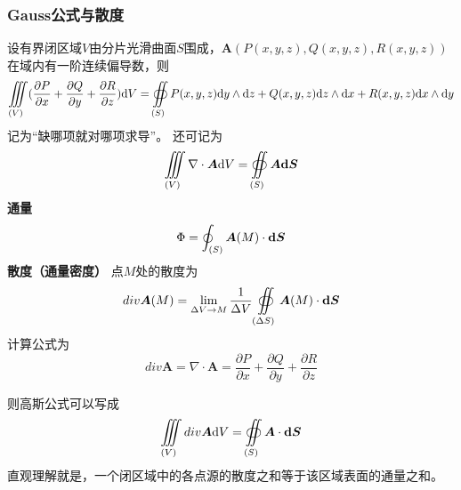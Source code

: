 \subsubsection{Gauss公式与散度}
设有界闭区域$V$由分片光滑曲面$S$围成，$\bm{A}(P(x,y,z),Q(x,y,z),R(x,y,z))$在域内有一阶连续偏导数，则
\begin{equation}\label{key}
	\iiint\limits_{(V)}(\dfrac{\partial P}{\partial x}+\dfrac{\partial Q}{\partial y}+\dfrac{\partial R}{\partial z})\mathrm{d} V=\oiint\limits_{(S)}P(x,y,z)\mathrm{d} y \wedge \mathrm{d} z+Q(x,y,z)\mathrm{d} z \wedge \mathrm{d} x+R(x,y,z)\mathrm{d} x \wedge \mathrm{d} y
\end{equation}
记为“缺哪项就对哪项求导”。
还可记为
\begin{equation}\label{key}
	\iiint\limits_{(V)}\nabla\cdot \bm{A}\mathrm{d} V=\oiint \limits_{(S)}\bm{A}\bm{\mathrm{d} S}
\end{equation}
\textbf{通量}
\begin{equation}\label{key}
	\Phi=\oint_{(S)}\bm{A}(M)\cdot \bm{\mathrm{d} S}
\end{equation}
\textbf{散度（通量密度）} \quad 点$M$处的散度为
\begin{equation}\label{key}
	div \bm{A}(M)=\lim\limits_{\Delta V \to M} \dfrac{1}{\Delta V}\oiint\limits_{(\Delta S)}\bm{A}(M)\cdot \bm{\mathrm{d} S}
\end{equation}
计算公式为
\begin{equation}\label{key}
	div \bm{A}=\nabla\cdot \bm{A}=\dfrac{\partial P}{\partial x}+\dfrac{\partial Q}{\partial y}+\dfrac{\partial R}{\partial z}
\end{equation}

则高斯公式可以写成
\begin{equation}\label{key}
	\iiint\limits_{(V)}div \bm{A}\mathrm{d} V=\oiint\limits_{(S)}\bm{A}\cdot \bm{\mathrm{d} S}
\end{equation}
直观理解就是，一个闭区域中的各点源的散度之和等于该区域表面的通量之和。

